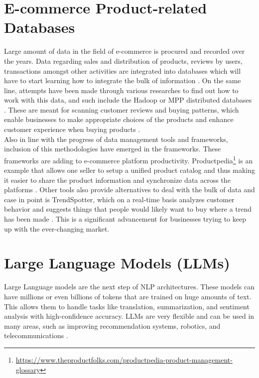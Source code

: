 \section{E-commerce Product-related Databases}
Large amount of data in the field of e-commerce is procured and recorded over the years. Data regarding sales and distribution of products, reviews by users, transactions amongst other activities are integrated into databases which will have to start learning how to integrate the bulk of information \cite{Muntjir2016}. On the same line, attempts have been made through various researches to find out how to work with this data, and such include the Hadoop or MPP distributed databases \citep{5496972}. These are meant for scanning customer reviews and buying patterns, which enable businesses to make appropriate choices of the products and enhance customer experience when buying products \citep{Liang_2020}.
\\

Also in line with the progress of data management tools and frameworks, inclusion of this methodologies have emerged in the frameworks. These frameworks are adding to e-commerce platform productivity. Productpedia\footnote{\url{https://www.theproductfolks.com/productpedia-product-management-glossary}} is an example that allows one seller to setup a unified product catalog and thus making it easier to share the product information and synchronize data across the platforms \citep{10.1007/978-3-319-20895-4_34}. Other tools also provide alternatives to deal with the bulk of data and case in point is TrendSpotter, which on a real-time basis analyzes customer behavior and suggests things that people would likely want to buy where a trend has been made \citep{10.1145/3583780.3615503}. This is a significant advancement for businesses trying to keep up with the ever-changing market.


\section{Large Language Models (LLMs)} 
Large Language models are the next step of NLP architectures. These models can have millions or even billions of tokens \citep{zhao2023survey} that are trained on huge amounts of text. This allows them to handle tasks like translation, summarization, and sentiment analysis with high-confidence accuracy. LLMs are very flexible and can be used in many areas, such as improving recommendation systems, robotics, and telecommunications \citep{10305960, fan2023fatellm}.
\\

